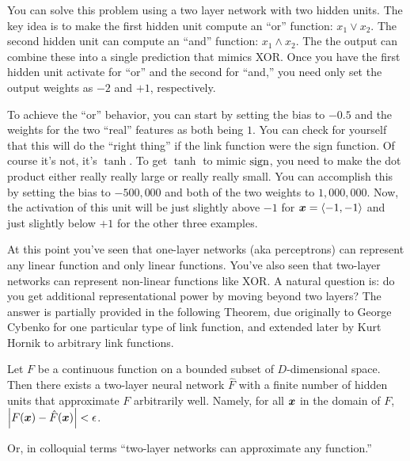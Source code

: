 You can solve this problem using a two layer network with two hidden
units.  The key idea is to make the first hidden unit compute an
``or'' function: $x_1 \lor x_2$.  The second hidden unit can compute
an ``and'' function: $x_1 \land x_2$.  The the output can combine
these into a single prediction that mimics XOR.  Once you have the
first hidden unit activate for ``or'' and the second for ``and,'' you
need only set the output weights as $-2$ and $+1$, respectively.


To achieve the ``or'' behavior, you can start by setting the bias to
$-0.5$ and the weights for the two ``real'' features as both being
$1$.  You can check for yourself that this will do the ``right thing''
if the link function were the sign function.  Of course it's not, it's
$\tanh$.  To get $\tanh$ to mimic $\textrm{sign}$, you need to make the dot
product either really really large or really really small.  You can
accomplish this by setting the bias to $-500,000$ and both of the two
weights to $1,000,000$.  Now, the activation of this unit will be just
slightly above $-1$ for ${\boldsymbol{x}} = \langle -1,-1 \rangle$ and just
slightly below $+1$ for the other three examples.


At this point you've seen that one-layer networks (aka perceptrons)
can represent any linear function and only linear functions.  You've
also seen that two-layer networks can represent non-linear functions
like XOR.  A natural question is: do you get additional
representational power by moving beyond two layers?  The answer is
partially provided in the following Theorem, due originally to George
Cybenko for one particular type of link function, and extended later
by Kurt Hornik to arbitrary link functions.

\begin{theorem} \label{thm:nnet:twolayer}
%
  Let $F$ be a continuous function on a bounded subset of
  $D$-dimensional space.  Then there exists a two-layer neural network
  $\hat F$ with a finite number of hidden units that approximate $F$
  arbitrarily well.  Namely, for all ${\boldsymbol{x}}$ in the domain of $F$,
  $\left\vert F({\boldsymbol{x}}) - \hat F({\boldsymbol{x}}) \right\vert < \epsilon$.
\end{theorem}

Or, in colloquial terms ``two-layer networks can approximate any
function.''

